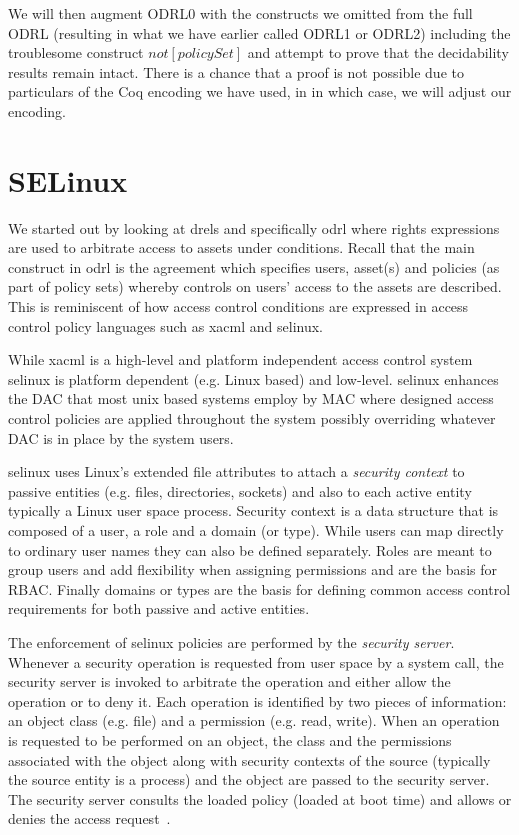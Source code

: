 We will then augment ODRL0 with the constructs we omitted from the full ODRL (resulting in what we have earlier called ODRL1 or ODRL2) including the troublesome construct $not[policySet]$ and attempt to prove that the decidability results remain intact. There is a chance that a proof is not possible due to particulars of the Coq encoding we have used, in in which case, we will adjust our encoding.

\section{SELinux}
 
We started out by looking at \ac{drel}s and specifically \ac{odrl} where rights expressions are used to arbitrate access to assets under conditions. Recall that the main construct in \ac{odrl} is the agreement which specifies users, asset(s) and policies (as part of policy sets) whereby controls on users' access to the assets are described. This is reminiscent of how access control conditions are expressed in access control policy languages such as \ac{xacml} and \ac{selinux}.

While \ac{xacml} is a high-level and platform independent access control system \ac{selinux} is platform dependent (e.g. Linux based) and low-level. \ac{selinux} enhances the \ac{DAC} that most unix based systems employ by \ac{MAC} where designed access control policies are applied throughout the system possibly overriding whatever \ac{DAC} is in place by the system users. 

\ac{selinux} uses Linux's extended file attributes to attach a \emph{security context} to passive entities (e.g. files, directories, sockets) and also to each active entity typically a Linux user space process. Security context is a data structure that is composed of a user, a role and a domain (or type). While users can map directly to ordinary user names they can also be defined separately. Roles are meant to group users and add flexibility when assigning permissions and are the basis for \ac{RBAC}. Finally domains or types are the basis for defining common access control requirements for both passive and active entities. 


The enforcement of \ac{selinux} policies are performed by the \emph{security server}. Whenever a security operation is requested from user space by a system call, the security server is invoked to arbitrate the operation and either allow the operation or to deny it. Each operation is identified by two pieces of information: an object class (e.g. file) and a permission (e.g. read, write). When an operation is requested to be performed on an object, the class and the permissions associated with the object along with security contexts of the source (typically the source entity is a process) and the object are passed to the security server. The security server consults the loaded policy (loaded at 
boot time) and allows or denies the access request~\cite{Sarna}.

